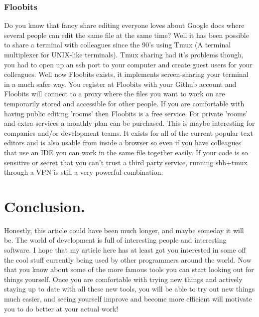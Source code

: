 \documentclass[paper=a4, fontsize=10pt]{scrartcl} %
\numberwithin{equation}{section} %
\numberwithin{figure}{section} %
\numberwithin{table}{section} %
\begin{document}
\subsubsection{Floobits\cite{floobits}}
Do you know that fancy share editing everyone loves about Google docs where
several people can edit the same file at the same time? Well it has been
possible to share a terminal with colleagues since the 90's using Tmux (A
terminal multiplexer for UNIX-like terminals).
Tmux sharing had it's problems though, you had to open up an ssh port to your
computer and create guest users for your colleagues. Well now Floobits exists,
it implements screen-sharing your terminal in a much safer way. You register at
Floobits with your Github account and Floobits will connect to a proxy where
the files you want to work on 
are temporarily stored and accessible for other people. If you are comfortable
with having public editing 'rooms' then Floobits is a free service. For private
'rooms' and extra services a monthly plan can be purchased. This is maybe
interesting for companies and/or development teams. It exists for
all of the current popular text editors and is also usable from inside a
browser so even if you have colleagues that use an IDE you can work in the same
file together easily. If your code is so sensitive or secret that you can't
trust a third party service, running shh+tmux through a VPN is still a very
powerful combination. 


\section{Conclusion.}
Honestly, this article could have been much longer, and maybe someday it will
be. The world of development is full of interesting people and interesting
software. I hope that my article here has at least got you interested in some
off the cool stuff currently being used by other programmers around the world.
Now that you know about some of the more famous tools you can start looking out
for things yourself. Once you are comfortable with trying new things and
actively staying up to date with all these new tools, you will be able to try
out new things much easier, and seeing yourself improve and become more
efficient will motivate you to do better at your actual work!
\end{document}
